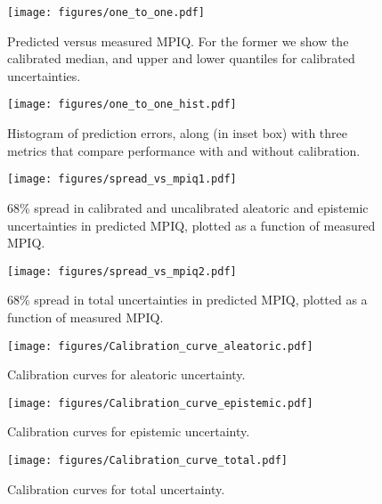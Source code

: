\begin{figure*}
\begin{subfigure}{0.49\textwidth}
    \centering
    \texttt{[image: figures/one\_to\_one.pdf]}
    \caption{Predicted versus measured MPIQ. For the former we show the calibrated median, and upper and lower quantiles for calibrated uncertainties.}
    \label{fig:mdn_one_to_one}
\end{subfigure}
\hfill
\begin{subfigure}{0.49\textwidth}
    \centering
    \texttt{[image: figures/one\_to\_one\_hist.pdf]}
    \caption{Histogram of prediction errors, along (in inset box) with three metrics that compare performance with and without calibration.}
    \label{fig:mdn_one_to_one_hist}
\end{subfigure}
\newline
\begin{subfigure}{0.49\textwidth}
    \centering
    \texttt{[image: figures/spread\_vs\_mpiq1.pdf]}
    \caption{68\% spread in calibrated and uncalibrated aleatoric and epistemic uncertainties in predicted MPIQ, plotted as a function of measured MPIQ.}
    \label{fig:mdn_CI_vs_mpiq1}
\end{subfigure}
\hfill
\begin{subfigure}{0.49\textwidth}
    \centering
    \texttt{[image: figures/spread\_vs\_mpiq2.pdf]}
    \caption{68\% spread in total uncertainties in predicted MPIQ, plotted as a function of measured MPIQ.}
    \label{fig:mdn_CI_vs_mpiq2}
\end{subfigure}
\newline
\begin{subfigure}{0.32\textwidth}
    \centering
    \texttt{[image: figures/Calibration\_curve\_aleatoric.pdf]}
    \caption{Calibration curves for aleatoric uncertainty.}
    \label{fig:mdn_calibration_curve_al}
\end{subfigure}
\begin{subfigure}{0.32\textwidth}
    \centering
    \texttt{[image: figures/Calibration\_curve\_epistemic.pdf]}
    \caption{Calibration curves for epistemic uncertainty.}
    \label{fig:mdn_calibration_curve_epis}
\end{subfigure}
\begin{subfigure}{0.32\textwidth}
    \centering
    \texttt{[image: figures/Calibration\_curve\_total.pdf]}
    \caption{Calibration curves for total uncertainty.}

\end{subfigure}
\end{figure*}
